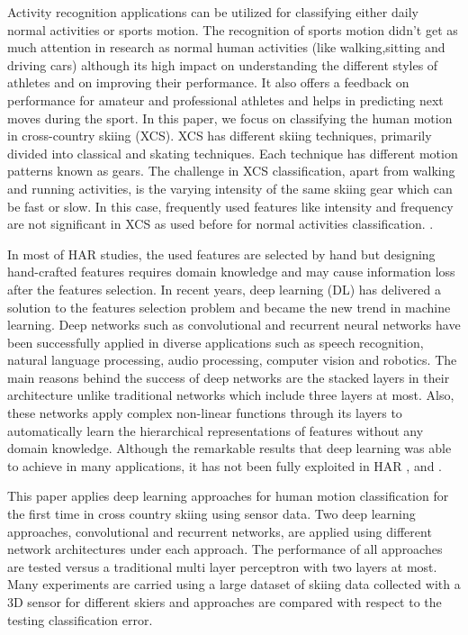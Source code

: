 \documentclass[12pt,a4paper]{article}
\begin{document}
Activity recognition applications can be utilized for classifying either daily normal activities or  sports motion. The recognition of sports motion didn't get as much attention in research as normal human activities (like walking,sitting  and driving cars) although its high impact on understanding the different styles of athletes and on improving their performance. It also offers a feedback on performance for amateur and professional athletes and helps in predicting next moves during the sport. In this paper, we focus on classifying the human motion in cross-country skiing (XCS). XCS has different skiing techniques, primarily divided into classical and skating techniques. Each technique has different motion patterns known as gears. The challenge in XCS classification, apart from walking and running activities, is the varying intensity of the same skiing gear which can be fast or slow. In this case, frequently used features like intensity and frequency are not significant in XCS as used before for normal activities classification. \cite{holst2013classification}. \par

In most of HAR studies, the used features are selected by hand but designing hand-crafted features requires domain knowledge and may cause information loss after the features selection. In recent years, deep learning (DL) has delivered a solution to the features selection problem and became the new trend in machine learning. Deep networks such as convolutional and recurrent neural networks have been successfully applied in diverse applications such as speech recognition, natural language processing, audio processing, computer vision and robotics. The main reasons behind the success of deep networks are the stacked layers in their architecture unlike traditional networks which include three layers at most. Also, these networks apply complex non-linear functions through its layers to automatically learn  the hierarchical representations of features without any domain knowledge.  Although the remarkable results that deep learning was able to achieve in many applications, it has not been fully exploited in HAR \cite{zeng2014convolutional},  \cite{yang2015deep} and \cite{chen2016lstm}.

This paper applies deep learning approaches for human motion classification for the first time in cross country skiing using sensor data. Two deep learning approaches, convolutional and recurrent networks, are applied using different network architectures under each approach. The performance of all approaches are tested versus a traditional multi layer perceptron with two layers at most. Many experiments are carried using a large dataset of skiing data collected with a 3D sensor for different skiers and approaches are compared with respect to the testing classification error.
\fontsize{11}{10}
\end{document}
